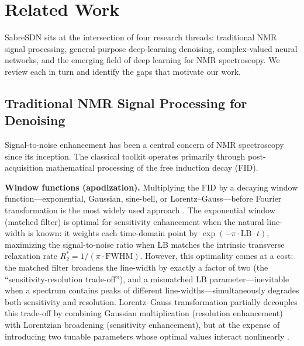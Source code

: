 
\section{Related Work}
\label{sec:related_work}

SabreSDN sits at the intersection of four research threads: traditional NMR
signal processing, general-purpose deep-learning denoising, complex-valued
neural networks, and the emerging field of deep learning for NMR spectroscopy.
We review each in turn and identify the gaps that motivate our work.

\subsection{Traditional NMR Signal Processing for Denoising}
\label{sec:rw_traditional}

Signal-to-noise enhancement has been a central concern of NMR spectroscopy
since its inception. The classical toolkit operates primarily through
post-acquisition mathematical processing of the free induction decay (FID).

\textbf{Window functions (apodization).}
Multiplying the FID by a decaying window function---exponential, Gaussian,
sine-bell, or Lorentz--Gauss---before Fourier transformation is the most
widely used approach \cite{Ernst1987}. The exponential window (matched filter)
is optimal for sensitivity enhancement when the natural line-width is known:
it weights each time-domain point by $\exp(-\pi \cdot \text{LB} \cdot t)$,
maximizing the signal-to-noise ratio when LB matches the intrinsic
transverse relaxation rate $R_2^* = 1/(\pi \cdot \text{FWHM})$. However,
this optimality comes at a cost: the matched filter broadens the line-width
by exactly a factor of two (the ``sensitivity-resolution trade-off''), and
a mismatched LB parameter---inevitable when a spectrum contains peaks of
different line-widths---simultaneously degrades both sensitivity and
resolution. Lorentz--Gauss transformation partially decouples this trade-off
by combining Gaussian multiplication (resolution enhancement) with Lorentzian
broadening (sensitivity enhancement), but at the expense of introducing two
tunable parameters whose optimal values interact nonlinearly
\cite{Lindon1980}.

